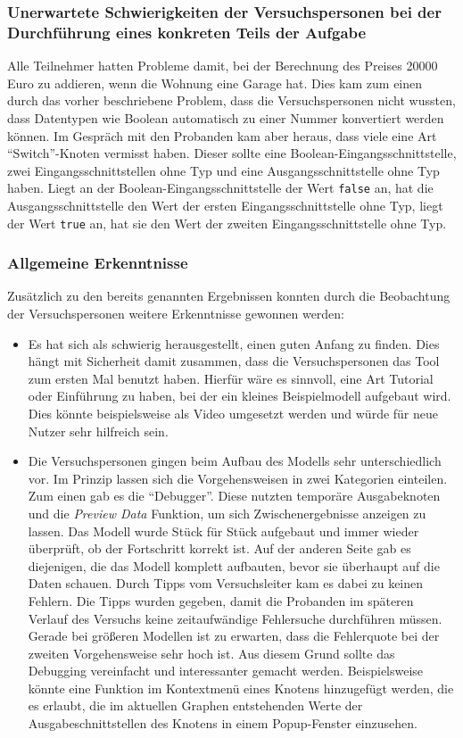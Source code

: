 \subsubsection{Unerwartete Schwierigkeiten der Versuchspersonen bei der Durchführung eines konkreten Teils der Aufgabe}
Alle Teilnehmer hatten Probleme damit, bei der Berechnung des Preises 20000 Euro zu addieren, wenn die Wohnung eine Garage hat. Dies kam zum einen durch das vorher beschriebene Problem, dass die Versuchspersonen nicht wussten, dass Datentypen wie Boolean automatisch zu einer Nummer konvertiert werden können. Im Gespräch mit den Probanden kam aber heraus, dass viele eine Art \enquote{Switch}-Knoten vermisst haben. Dieser sollte eine Boolean-Eingangsschnittstelle, zwei Eingangsschnittstellen ohne Typ und eine Ausgangsschnittstelle ohne Typ haben. Liegt an der Boolean-Eingangsschnittstelle der Wert \texttt{false} an, hat die Ausgangsschnittstelle den Wert der ersten Eingangsschnittstelle ohne Typ, liegt der Wert \texttt{true} an, hat sie den Wert der zweiten Eingangsschnittstelle ohne Typ.

\subsubsection{Allgemeine Erkenntnisse}
Zusätzlich zu den bereits genannten Ergebnissen konnten durch die Beobachtung der Versuchspersonen weitere Erkenntnisse gewonnen werden:
\begin{itemize}
    \item Es hat sich als schwierig herausgestellt, einen guten Anfang zu finden. Dies hängt mit Sicherheit damit zusammen, dass die Versuchspersonen das Tool zum ersten Mal benutzt haben. Hierfür wäre es sinnvoll, eine Art Tutorial oder Einführung zu haben, bei der ein kleines Beispielmodell aufgebaut wird. Dies könnte beispielsweise als Video umgesetzt werden und würde für neue Nutzer sehr hilfreich sein.
    \item Die Versuchspersonen gingen beim Aufbau des Modells sehr unterschiedlich vor. Im Prinzip lassen sich die Vorgehensweisen in zwei Kategorien einteilen. Zum einen gab es die \enquote{Debugger}. Diese nutzten temporäre Ausgabeknoten und die \textit{Preview Data} Funktion, um sich Zwischenergebnisse anzeigen zu lassen. Das Modell wurde Stück für Stück aufgebaut und immer wieder überprüft, ob der Fortschritt korrekt ist. Auf der anderen Seite gab es diejenigen, die das Modell komplett aufbauten, bevor sie überhaupt auf die Daten schauen. Durch Tipps vom Versuchsleiter kam es dabei zu keinen Fehlern. Die Tipps wurden gegeben, damit die Probanden im späteren Verlauf des Versuchs keine zeitaufwändige Fehlersuche durchführen müssen. Gerade bei größeren Modellen ist zu erwarten, dass die Fehlerquote bei der zweiten Vorgehensweise sehr hoch ist. Aus diesem Grund sollte das Debugging vereinfacht und interessanter gemacht werden. Beispielsweise könnte eine Funktion im Kontextmenü eines Knotens hinzugefügt werden, die es erlaubt, die im aktuellen Graphen entstehenden Werte der Ausgabeschnittstellen des Knotens in einem Popup-Fenster einzusehen.
\end{itemize}